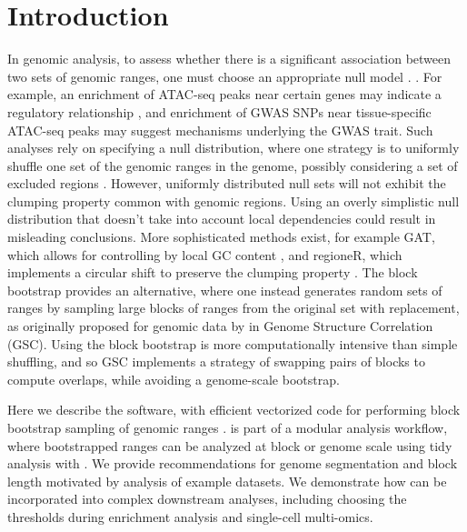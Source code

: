 \section{Introduction}

In genomic analysis, to assess whether
there is a significant association between two sets of genomic ranges, 
one must choose an appropriate null model \citep{reviewdilemma2014,kanduri2018}.
.
For example, an enrichment of ATAC-seq peaks near certain genes
may indicate a regulatory relationship \citep{lee2020fluent}, 
and enrichment of GWAS SNPs near tissue-specific ATAC-seq peaks may
suggest mechanisms underlying the GWAS trait.
Such analyses rely on specifying a null distribution, where one
strategy is to uniformly shuffle one set of the
genomic ranges in the genome, possibly considering a set of
excluded regions .
However, uniformly distributed null sets will not exhibit the
clumping property common with genomic regions.
Using an overly simplistic null distribution that doesn't take into
account local dependencies could result in misleading conclusions.
More sophisticated methods exist, for example
GAT, which allows for controlling by local GC content
\citep{GAT_2013}, and regioneR, which implements a circular shift to
preserve the clumping property \citep{gel2016regioner}.
The block bootstrap \citep{politis1999subsampling}
provides an alternative, where one instead generates
random sets of ranges by sampling large blocks of ranges from the
original set with replacement, as originally proposed for 
genomic data by \citet{bickel2010subsampling} in Genome Structure
Correlation (GSC).
Using the block bootstrap is more
computationally intensive than simple shuffling, and so GSC implements
a strategy of swapping pairs of blocks to compute overlaps, while
avoiding a genome-scale bootstrap.

Here we describe the \bootranges software, with efficient
vectorized code for performing block bootstrap sampling of genomic ranges
\citep{lawrence2013software}.
\bootranges is part of a modular analysis workflow, where bootstrapped
ranges can be analyzed at block or genome scale using tidy
analysis with \plyranges \citep{lee2019plyranges}.
We provide recommendations for genome segmentation and block length
motivated by analysis of example datasets.
We demonstrate how \bootranges can be incorporated into complex
downstream analyses, including choosing the thresholds during
enrichment analysis and single-cell multi-omics.


